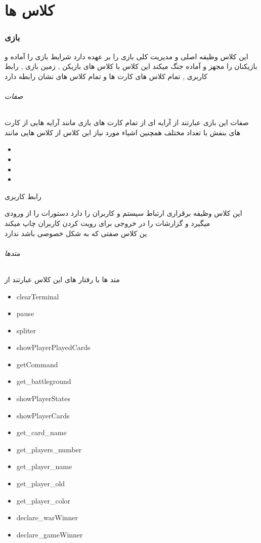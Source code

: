 \documentclass[pdf,titlepage,a4paper]{report}
\begin{document}
	\part{کلاس ها}
		
	\newpage
	\section{بازی}
	این کلاس وظیفه اصلی و مدیریت کلی بازی را بر عهده دارد شرایط بازی را آماده و بازیکنان را مجهز و آماده جنگ میکند
	این کلاس با کلاس های بازیکن , زمین بازی , رابط کاربری , تمام کلاس های کارت ها و تمام کلاس های نشان رابطه دارد
	\paragraph{صفات}
	صفات این بازی عبارتند از آرایه ای از تمام کارت های بازی مانند آرایه هایی از کارت های بنفش با تعداد مختلف
	همچنین اشیاء مورد نیاز این کلاس از کلاس هایی مانند
	\begin{latin}
		\begin{itemize}
			\item {}
			\item {}
			\item {}
			\item {}
		\end{itemize}
	\end{latin}
	

	\subparagraph{رابط کاربری}
	این کلاس وظیفه برقراری ارتباط سیستم و کاربران را دارد دستورات را از ورودی میگیرد و گزارشات را در خروجی برای رویت کردن کاربران چاپ میکند\\
    ین کلاس صفتی که به شکل خصوصی باشد ندارد 
	\paragraph{متدها}
	متد ها یا رفتار های این کلاس عبارتند از 
	\begin{latin}
		\begin{itemize}
			\item clearTerminal
			\item pause
			\item spliter
			\item showPlayerPlayedCards
			\item getCommand
			\item get\_battleground
			\item showPlayerStates 
			\item showPlayerCards
			\item get\_card\_name
			\item get\_players\_number
			\item get\_player\_name
			\item get\_player\_old
			\item get\_player\_color 
			\item declare\_warWinner
			\item declare\_gameWinner
		\end{itemize}
	\end{latin}
\end{document}
